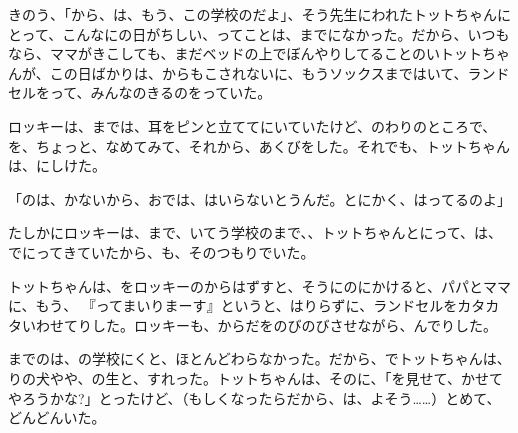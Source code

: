 きのう、「から、は、もう、この学校のだよ」、そう先生にわれたトットちゃんにとって、こんなにの日がちしい、ってことは、までになかった。だから、いつもなら、ママがきこしても、まだベッドの上でぼんやりしてることのいトットちゃんが、この日ばかりは、からもこされないに、もうソックスまではいて、ランドセルをって、みんなのきるのをっていた。

ロッキーは、までは、耳をピンと立ててにいていたけど、のわりのところで、を、ちょっと、なめてみて、それから、あくびをした。それでも、トットちゃんは、にしけた。

「のは、かないから、おでは、はいらないとうんだ。とにかく、はってるのよ」

たしかにロッキーは、まで、いてう学校のまで、、トットちゃんとにって、は、でにってきていたから、も、そのつもりでいた。

トットちゃんは、をロッキーのからはずすと、そうにのにかけると、パパとママに、もう、 『ってまいりまーす』というと、はりらずに、ランドセルをカタカタいわせてりした。ロッキーも、からだをのびのびさせながら、んでりした。

までのは、の学校にくと、ほとんどわらなかった。だから、でトットちゃんは、りの犬やや、の生と、すれった。トットちゃんは、そのに、「を見せて、かせてやろうかな?」とったけど、（もしくなったらだから、は、よそう……）とめて、どんどんいた。

